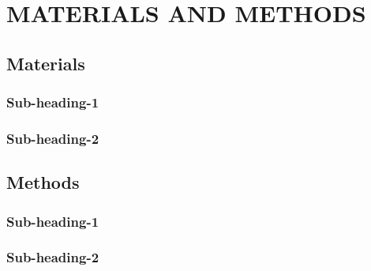 \chapter{MATERIALS AND METHODS}

\section{Materials}

\subsection{Sub-heading-1}

\subsection{Sub-heading-2}

\section{Methods}

\subsection{Sub-heading-1}

\subsection{Sub-heading-2}




















